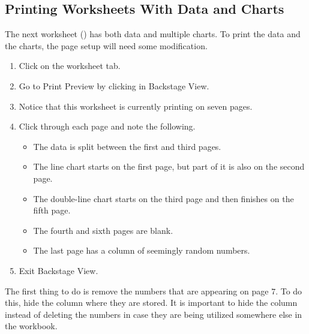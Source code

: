 \subsection{Printing Worksheets With Data and Charts}

The next worksheet () has both data and multiple charts. To print the data and the charts, the page setup will need some modification.

\begin{enumerate}
	\item Click on the  worksheet tab.
	\item Go to Print Preview by clicking  in Backstage View.
	\item Notice that this worksheet is currently printing on seven pages.
	\item Click through each page and note the following.

	\begin{itemize}
		\item The data is split between the first and third pages.
		\item The line chart starts on the first page, but part of it is also on the second page.
		\item The double-line chart starts on the third page and then finishes on the fifth page.
		\item The fourth and sixth pages are blank.
		\item The last page has a column of seemingly random numbers.
	\end{itemize}

	\item Exit Backstage View.
\end{enumerate}

The first thing to do is remove the numbers that are appearing on page $ 7 $. To do this, hide the column where they are stored. It is important to hide the column instead of deleting the numbers in case they are being utilized somewhere else in the workbook.

